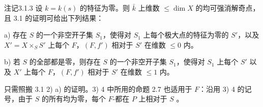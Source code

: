 \begin{SGAresult}{注记}{3.1.3}
设 $k=k(s)$ 的特征为零。则 $\bar k$ 上维数 $\leq\dim X$ 的均可强消解奇点，且 3.1 的证明可给出下列结果：

a) 存在 $S$ 的一个非空开子集 $S_1$，使得对 $S_1$ 上每个极大点的特征为零的 $S'$，以及 $X'=X\times_S S'$ 上每个 $F$，$(F,f')$ 相对于 $S'$ 在维数 $\leq0$ 内。

b) 若 $S$ 的全部都是零，则存在 $S$ 的一个非空开子集 $S_1$，使得对 $S_1$ 上每个 $S'$ 以及 $X'$ 上每个 $F$，$(F,f')$ 相对于 $S'$ 在维数 $\leq1$ 内。
\end{SGAresult}
只需照搬 3.1 2) a) 的证明。3) 4 中所用的命题 2.7 也适用于 $F$：沿用 3) 4 的记号，由于 $S$ 的所有均为零，每个 $F$-都在 $P$ 上相对于 $S$ 。

